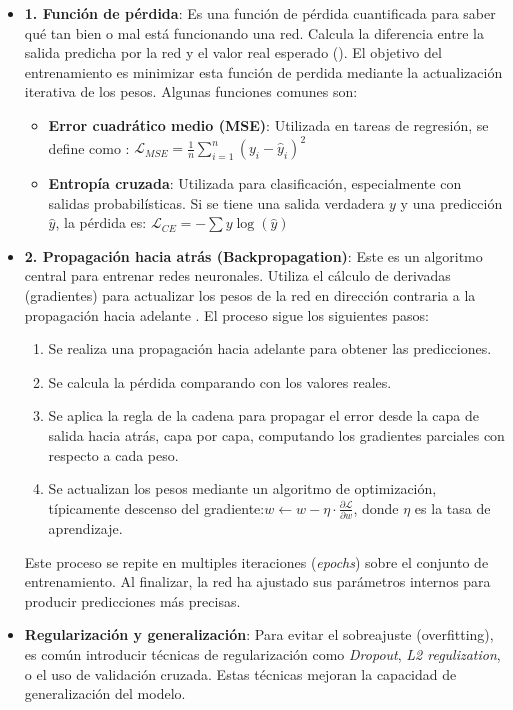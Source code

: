 \documentclass[11pt]{article} %
\begin{document}
\begin{itemize}
\item\textbf{1. Función de pérdida}:\newline
Es una función de pérdida cuantificada para saber qué tan bien o mal está funcionando una red. Calcula la diferencia entre la salida predicha por la red y el valor real esperado (\cite{zhou2020graph}). El objetivo del entrenamiento es minimizar esta función de perdida mediante la actualización iterativa de los pesos. \newline Algunas funciones comunes son:
\begin{itemize}
    \item \textbf{Error cuadrático medio (MSE)}: Utilizada en tareas de regresión, se define como : $\mathcal{L}_{MSE} = \frac{1}{n} \sum_{i=1}^{n}(y_i - \hat{y}_i)^2$
    \item \textbf{Entropía cruzada}: Utilizada para clasificación, especialmente con salidas probabilísticas. Si se tiene una salida verdadera $y$ y una predicción $\hat{y}$, la pérdida es: $\mathcal{L}_{CE} = -\sum y \log(\hat{y})$
\end{itemize}

\item\textbf{2. Propagación hacia atrás (Backpropagation)}:\newline
Este es un algoritmo central para entrenar redes neuronales. Utiliza el cálculo de derivadas (gradientes) para actualizar los pesos de la red en dirección contraria a la propagación hacia adelante . El proceso sigue los siguientes pasos:
\begin{enumerate}
    \item Se realiza una propagación hacia adelante para obtener las predicciones.
    \item Se calcula la pérdida comparando con los valores reales.
    \item Se aplica la regla de la cadena para propagar el error desde la capa de salida hacia atrás, capa por capa, computando los gradientes parciales con respecto a cada peso.
    \item Se actualizan los pesos mediante un algoritmo de optimización, típicamente descenso del gradiente:$w \leftarrow w - \eta \cdot \frac{\partial \mathcal{L}}{\partial w}$, donde $\eta$ es la tasa de aprendizaje.
\end{enumerate}
Este proceso se repite en multiples iteraciones (\textit{epochs}) sobre el conjunto de entrenamiento. Al finalizar, la red ha ajustado sus parámetros internos para producir predicciones más precisas.

\item \textbf{Regularización y generalización}: \newline
Para evitar el sobreajuste (overfitting), es común introducir técnicas de regularización como \textit{Dropout}, \textit{L2 regulization}, o el uso de validación cruzada. Estas técnicas mejoran la capacidad de generalización del modelo.
\end{itemize}
\end{document}
